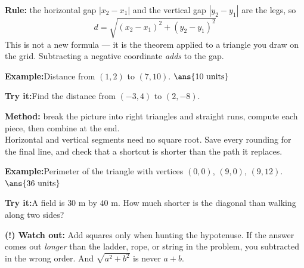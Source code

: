 \documentclass[12pt]{article}
\begin{document}
\begin{formulabox}
\textbf{Rule:} the horizontal gap $|x_2 - x_1|$ and the vertical gap
$|y_2 - y_1|$ are the legs, so
\[ d = \sqrt{(x_2-x_1)^2 + (y_2-y_1)^2} \]
This is not a new formula --- it is the theorem applied to a triangle you draw
on the grid. Subtracting a negative coordinate \emph{adds} to the gap.
\end{formulabox}
\begin{examplebox}
\textbf{Example:}\quad Distance from $(1, 2)$ to $(7, 10)$.
$\ans{10\ \text{units}}$
\end{examplebox}
\begin{tryitbox}
\textbf{Try it:}\quad Find the distance from $(-3, 4)$ to $(2, -8)$.\\[2pt]
\end{tryitbox}

\begin{formulabox}
\textbf{Method:} break the picture into right triangles and straight runs,
compute each piece, then combine at the end.\\[3pt]
Horizontal and vertical segments need no square root. Save every rounding for
the final line, and check that a shortcut is shorter than the path it replaces.
\end{formulabox}
\begin{examplebox}
\textbf{Example:}\quad Perimeter of the triangle with vertices $(0,0)$,
$(9,0)$, $(9,12)$.
$\ans{36\ \text{units}}$
\end{examplebox}
\begin{tryitbox}
\textbf{Try it:}\quad A field is $30$ m by $40$ m. How much shorter is the
diagonal than walking along two sides?\\[2pt]
\end{tryitbox}

\begin{watchoutbox}
\textbf{(!) Watch out:} Add squares only when hunting the hypotenuse. If the
answer comes out \emph{longer} than the ladder, rope, or string in the problem,
you subtracted in the wrong order. And $\sqrt{a^2 + b^2}$ is never $a + b$.
\end{watchoutbox}
\end{document}
